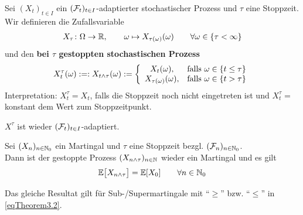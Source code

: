 \begin{defi}
	Sei $(X_t)_{t\in I}$ ein $(\mathcal{F}_t)_{t\in I}$-adaptierter stochastischer Prozess und $\tau$ eine Stoppzeit. Wir definieren die Zufallsvariable
	\begin{align*}
		X_\tau\colon\Omega\to\mathbb{R},\qquad \omega\mapsto X_{\tau(\omega)}(\omega)\qquad\forall \omega\in\lbrace\tau<\infty\rbrace
	\end{align*} 
	und den \textbf{bei $\tau$ gestoppten stochastischen Prozess}
	\begin{align*}
		X_t^\tau(\omega):=:X_{t\wedge\tau}(\omega):=\left\lbrace\begin{array}{cl}
			X_t(\omega), & \text{falls } \omega\in\lbrace t\leq\tau\rbrace\\
			X_{\tau(\omega)}(\omega), &\text{falls }\omega\in\lbrace t>\tau\rbrace
		\end{array}\right.
	\end{align*}
	Interpretation: $X_t^\tau=X_t$, falls die Stoppzeit noch nicht eingetreten ist und $X_t^\tau=$ konstant dem Wert zum Stoppzeitpunkt.
\end{defi}

\begin{bemerkung}
	$X^\tau$ ist wieder $(\mathcal{F}_t)_{t\in I}$-adaptiert.
\end{bemerkung}

\begin{theorem}\label{theorem3.2}
	Sei $(X_n)_{n\in\mathbb{N}_0}$ ein Martingal und $\tau$ eine Stoppzeit bezgl. $(\mathcal{F}_n)_{n\in\mathbb{N}_0}$.\\
	Dann ist der gestoppte Prozess $(X_{n\wedge\tau})_{n\in\mathbb{N}}$ wieder ein Martingal und es gilt
	\begin{align}\label{eqTheorem3.2}
		\mathbb{E}\big[X_{n\wedge\tau}\big]=\mathbb{E}[X_0]\qquad\forall n\in\mathbb{N}_0
	\end{align}
\end{theorem}

\begin{bemerkung}
	Das gleiche Resultat gilt für Sub-/Supermartingale mit ``$\geq$'' bzw. ``$\leq$'' in \eqref{eqTheorem3.2}.
\end{bemerkung}


